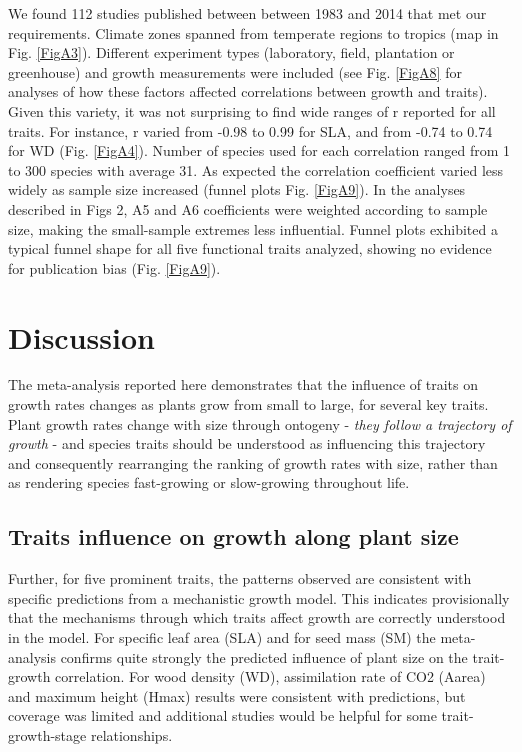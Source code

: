 \documentclass[a4paper]{article}\usepackage[]{graphicx}\usepackage[]{color}
\begin{document}
We found 112 studies published between between 1983 and 2014 that met our requirements. Climate zones spanned from temperate regions to  tropics (map in Fig. \ref{FigA3}). Different experiment types (laboratory, field, plantation or greenhouse) and growth measurements were included (see Fig. \ref{FigA8} for analyses of how these factors affected  correlations between growth and traits). Given this variety, it was not surprising to find wide ranges of r reported for all traits. For instance,  r varied from -0.98 to 0.99 for SLA, and from -0.74 to 0.74 for WD (Fig. \ref{FigA4}). Number of species used for each correlation ranged from 1 to 300 species with average  31. As expected the correlation coefficient varied less widely as sample size increased (funnel plots Fig. \ref{FigA9}). In the analyses described in Figs 2, A5 and A6 coefficients were weighted according to sample size, making the small-sample extremes less influential. Funnel plots exhibited a typical funnel shape for all five functional traits analyzed, showing no evidence for publication bias (Fig. \ref{FigA9}).


\section*{Discussion}\label{discussion}

The meta-analysis reported here demonstrates that the influence of traits on growth rates changes as plants grow from small to large, for several key traits. Plant growth rates change with size through ontogeny  \citep{Condit:1993hd, Clark:1999ed, Herault:2011dd} - \textit{they follow a trajectory of growth} - and species traits should be understood as influencing this trajectory and consequently rearranging the ranking of growth rates with size, rather than as rendering species fast-growing or slow-growing throughout life. 

\subsection*{Traits influence on growth along plant size}

Further, for five prominent traits, the patterns observed are consistent with specific predictions from a mechanistic growth model. This indicates provisionally that the mechanisms through which traits affect growth are correctly understood in the model. For specific leaf area (SLA) and for seed mass (SM) the meta-analysis confirms quite strongly the predicted influence of plant size on the trait-growth correlation. For wood density (WD), assimilation rate of CO2 (Aarea) and maximum height (Hmax) results were consistent with predictions, but coverage was limited and additional studies would be helpful for some trait-growth-stage relationships. 
\end{document}
